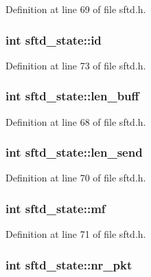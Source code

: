 Definition at line 69 of file sftd.h.

\hypertarget{structsftd__state_a605709a687f776374adee211a843181e}{
\subsubsection[{id}]{\setlength{\rightskip}{0pt plus 5cm}int {\bf sftd\_\-state::id}}}
\label{structsftd__state_a605709a687f776374adee211a843181e}


Definition at line 73 of file sftd.h.

\hypertarget{structsftd__state_a880aa9d9dc3a838772d4ce434b5adf59}{
\subsubsection[{len\_\-buff}]{\setlength{\rightskip}{0pt plus 5cm}int {\bf sftd\_\-state::len\_\-buff}}}
\label{structsftd__state_a880aa9d9dc3a838772d4ce434b5adf59}


Definition at line 68 of file sftd.h.

\hypertarget{structsftd__state_a358d042191980bf59769f7db60e0e116}{
\subsubsection[{len\_\-send}]{\setlength{\rightskip}{0pt plus 5cm}int {\bf sftd\_\-state::len\_\-send}}}
\label{structsftd__state_a358d042191980bf59769f7db60e0e116}


Definition at line 70 of file sftd.h.

\hypertarget{structsftd__state_a23fcaaae4f5f1874069db0d74550c6b7}{
\subsubsection[{mf}]{\setlength{\rightskip}{0pt plus 5cm}int {\bf sftd\_\-state::mf}}}
\label{structsftd__state_a23fcaaae4f5f1874069db0d74550c6b7}


Definition at line 71 of file sftd.h.

\hypertarget{structsftd__state_a79a4ba0983912c7066e1f324ee126c58}{
\subsubsection[{nr\_\-pkt}]{\setlength{\rightskip}{0pt plus 5cm}int {\bf sftd\_\-state::nr\_\-pkt}}}
\label{structsftd__state_a79a4ba0983912c7066e1f324ee126c58}


